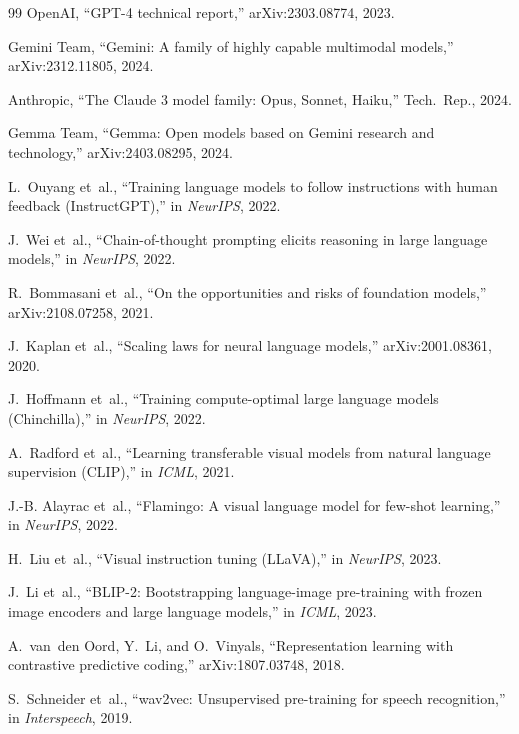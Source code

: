 \begin{thebibliography}{99}
OpenAI, ``GPT-4 technical report,'' arXiv:2303.08774, 2023.

Gemini Team, ``Gemini: A family of highly capable multimodal models,''
arXiv:2312.11805, 2024.

Anthropic, ``The Claude 3 model family: Opus, Sonnet, Haiku,'' Tech.\ Rep., 2024.

Gemma Team, ``Gemma: Open models based on Gemini research and technology,''
arXiv:2403.08295, 2024.

L.~Ouyang et~al., ``Training language models to follow instructions with human
feedback (InstructGPT),'' in \emph{NeurIPS}, 2022.

J.~Wei et~al., ``Chain-of-thought prompting elicits reasoning in large language
models,'' in \emph{NeurIPS}, 2022.

R.~Bommasani et~al., ``On the opportunities and risks of foundation models,''
arXiv:2108.07258, 2021.

J.~Kaplan et~al., ``Scaling laws for neural language models,''
arXiv:2001.08361, 2020.

J.~Hoffmann et~al., ``Training compute-optimal large language models
(Chinchilla),'' in \emph{NeurIPS}, 2022.

A.~Radford et~al., ``Learning transferable visual models from natural language
supervision (CLIP),'' in \emph{ICML}, 2021.

J.-B. Alayrac et~al., ``Flamingo: A visual language model for few-shot
learning,'' in \emph{NeurIPS}, 2022.

H.~Liu et~al., ``Visual instruction tuning (LLaVA),'' in \emph{NeurIPS}, 2023.

J.~Li et~al., ``BLIP-2: Bootstrapping language-image pre-training with frozen
image encoders and large language models,'' in \emph{ICML}, 2023.

A.~van~den Oord, Y.~Li, and O.~Vinyals, ``Representation learning with
contrastive predictive coding,'' arXiv:1807.03748, 2018.

S.~Schneider et~al., ``wav2vec: Unsupervised pre-training for speech
recognition,'' in \emph{Interspeech}, 2019.


\end{thebibliography}
